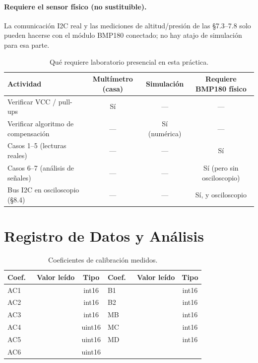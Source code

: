 \documentclass[11pt]{article}
\begin{document}
\paragraph{Requiere el sensor físico (no sustituible).} La comunicación I2C real y las
mediciones de altitud/presión de las \S7.3--7.8 solo pueden hacerse con el módulo
BMP180 conectado; no hay atajo de simulación para esa parte.

\begin{table}[H]\centering
\caption{Qué requiere laboratorio presencial en esta práctica.}
\begin{tabular}{lccc}
\toprule
Actividad & Multímetro (casa) & Simulación & Requiere BMP180 físico \\
\midrule
Verificar VCC / pull-ups & Sí & --- & --- \\
Verificar algoritmo de compensación & --- & Sí (numérica) & --- \\
Casos 1--5 (lecturas reales) & --- & --- & Sí \\
Casos 6--7 (análisis de señales) & --- & --- & Sí (pero sin osciloscopio) \\
Bus I2C en osciloscopio (\S8.4) & --- & --- & Sí, y osciloscopio \\
\bottomrule
\end{tabular}
\end{table}

\section{Registro de Datos y Análisis}

\begin{table}[H]\centering
\caption{Coeficientes de calibración medidos.}
\label{tab:coef}
\begin{tabular}{lcc | lcc}
\toprule
Coef.\ & Valor leído & Tipo & Coef.\ & Valor leído & Tipo \\
\midrule
AC1 & & int16  & B1 & & int16 \\
AC2 & & int16  & B2 & & int16 \\
AC3 & & int16  & MB & & int16 \\
AC4 & & uint16 & MC & & int16 \\
AC5 & & uint16 & MD & & int16 \\
AC6 & & uint16 & & & \\
\bottomrule
\end{tabular}
\end{table}
\end{document}
